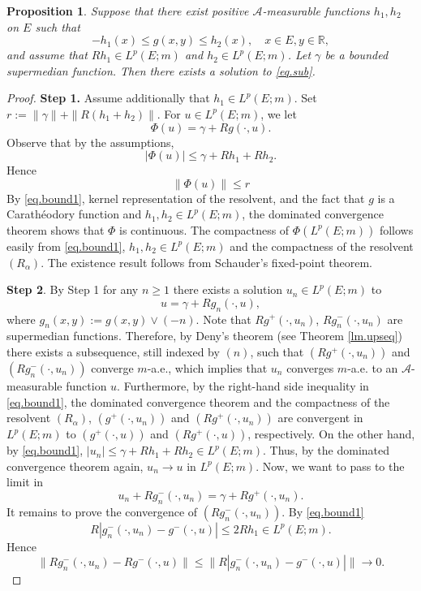 \documentclass[11pt,a4paper,reqno]{amsart}
\newtheorem{proposition}[theorem]{\bf Proposition}
\theoremstyle{definition}
\numberwithin{equation}{section}
\begin{document}
\begin{proposition}
\label{prop.exist}
Suppose that there exist positive $\mathcal A$-measurable functions $h_1,h_2$ on $E$ such that
\begin{equation}
\label{eq.bound1}
-h_1(x)\le g(x,y) \leq  h_2(x), \quad x \in  E,y \in \mathbb{R},
\end{equation}
and assume that $Rh_1\in L^p(E;m)$ and  $h_2\in L^p(E;m)$. Let $\gamma$ be a bounded supermedian function.
Then there exists a solution to \eqref{eq.sub}.
\end{proposition}
\begin{proof}
{\bf Step 1.} Assume additionally that $h_1\in L^p(E;m)$.
Set $r:=\|\gamma\|+\|R(h_1+h_2)\|$. For $u \in L^p(E;m)$, we let
$$
\Phi(u)=\gamma+R g(\cdot, u).
$$
Observe that by the assumptions,
$$
|\Phi(u)| \leq \gamma+ Rh_1+Rh_2.
$$
Hence
$$
\|\Phi(u)\| \leq r
$$
By \eqref{eq.bound1}, kernel representation of the resolvent,  and  the fact that $g$ is a Carath\'eodory function and $h_1,h_2\in L^p(E;m)$, 
the dominated convergence theorem shows that $\Phi$ is continuous.
The compactness of $\Phi(L^p(E;m))$ follows easily from \eqref{eq.bound1}, 
$h_1,h_2\in L^p(E;m)$ and the compactness of the resolvent $(R_\alpha)$.
The existence result follows from Schauder’s fixed-point theorem.

{\bf Step 2}. By  Step 1 for any $n\ge 1$ there exists a solution $u_n\in L^p(E;m)$ to 
\begin{equation}
\label{eq.subnnn}
u=\gamma+Rg_n(\cdot,u),
\end{equation}
where $g_n(x,y):= g(x,y)\vee (-n)$. Note that $Rg^+(\cdot,u_n)$, $Rg^-_n(\cdot,u_n)$ are supermedian functions.
Therefore, by  Deny's theorem (see Theorem  \ref{lm.upseq})  there exists a subsequence, still indexed by $(n)$, 
such that $(Rg^+(\cdot,u_n))$
and $(Rg^-_n(\cdot,u_n))$  converge $m$-a.e., which implies that $u_n$  
converges $m$-a.e. to an $\mathcal A$-measurable  function $u$.
Furthermore, by the right-hand side inequality in \eqref{eq.bound1}, the  dominated convergence theorem  and the compactness 
of the resolvent $(R_\alpha)$, $(g^+(\cdot,u_n))$ and $(Rg^+(\cdot,u_n))$  are  convergent in $L^p(E;m)$
to $(g^+(\cdot,u))$ and $(Rg^+(\cdot,u))$, respectively.
On the other hand,   by \eqref{eq.bound1}, $|u_n|\le \gamma +Rh_1+Rh_2\in L^p(E;m)$.
Thus,  by  the  dominated convergence theorem again, $u_n\to u$ in $L^p(E;m)$.
Now, we want to pass to the limit in 
\begin{equation}
\label{eq.subnnnnn}
u_n+Rg^-_n(\cdot,u_n)=\gamma+Rg^+(\cdot,u_n).
\end{equation}
It remains to prove the convergence of $(Rg^-_n(\cdot,u_n))$. By \eqref{eq.bound1}
\[
R|g^-_n(\cdot,u_n)-g^-(\cdot,u)| \leq 2 R h_1 \in L^p(E;m) .
\]
Hence
\[
\|R g^-_n(\cdot,u_n)-R g^-(\cdot,u)\| \leq\|R|g^-_n(\cdot,u_n)-g^-(\cdot,u)|\| \longrightarrow 0 .
\]
\end{proof}
\end{document}
